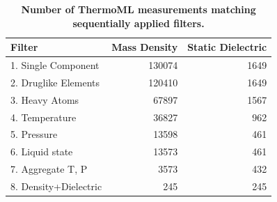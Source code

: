 \documentclass[aps,pre,twocolumn,nofootinbib,superscriptaddress,linenumbers]{revtex4-1}
\begin{document}
\begin{table}
\begin{tabular}{lrr}
\toprule
Filter &  Mass Density &  Static Dielectric \\ 
\midrule
1.  Single Component   &               130074 &                                     1649 \\
2.  Druglike Elements  &               120410 &                                     1649 \\
3.  Heavy Atoms        &                67897 &                                     1567 \\
4.  Temperature        &                36827 &                                      962 \\
5.  Pressure           &                13598 &                                      461 \\
6.  Liquid state       &                13573 &                                      461 \\
7.  Aggregate T, P     &                 3573 &                                      432 \\
8.  Density+Dielectric &                  245 &                                      245 \\
\bottomrule
\end{tabular}
\caption{{\bf Number of ThermoML measurements matching sequentially applied filters.}}
\label{table:ThermoMLSummary}
\end{table}
\end{document}
